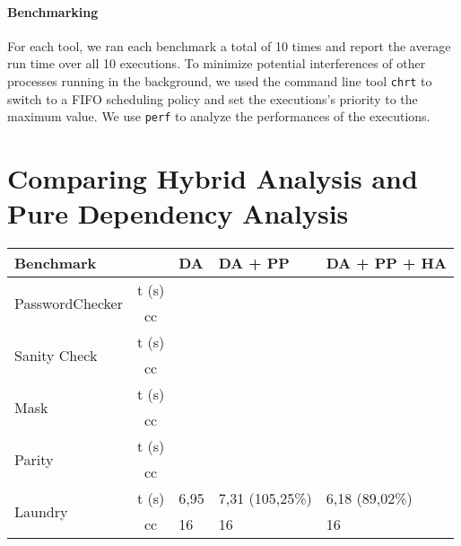 \paragraph{Benchmarking}
For each tool, we ran each benchmark a total of 10 times and report the average run time over all 10 executions. To minimize potential interferences of other processes running in the background, we used the command line tool \texttt{chrt} to switch to a FIFO scheduling policy and set the executions's priority to the maximum value.
We use \texttt{perf} to analyze the performances of the executions.

\section{Comparing Hybrid Analysis and Pure Dependency Analysis}
\begin{center}
\begin{table}[]
    \begin{tabular}{|l|c|l|l|l|}
    \hline
    \textbf{Benchmark}               & \multicolumn{1}{l|}{}      & DA & DA + PP & DA + PP + HA \\ \hline
    \multirow{2}{*}{PasswordChecker} & \multicolumn{1}{l|}{t (s)} &    &         &               \\ \cline{2-5} 
                                     & cc                         &    &         &               \\ \hline
    \multirow{2}{*}{Sanity Check}    & \multicolumn{1}{l|}{t (s)} &    &         &               \\ \cline{2-5} 
                                     & cc                         &    &         &               \\ \hline
    \multirow{2}{*}{Mask}            & t (s)                      &    &         &               \\ \cline{2-5} 
                                     & cc                         &    &         &               \\ \hline
    \multirow{2}{*}{Parity}          & t (s)                      &    &         &               \\ \cline{2-5} 
                                     & cc                         &    &         &               \\ \hline
    \multirow{2}{*}{Laundry}         & t (s)                      &  6,95  &  7,31 (105,25\%) & 6,18 (89,02\%) \\ \cline{2-5} 
                                     & cc                         & 16 &    16     &    16           \\ \hline

\end{tabular}
\end{table}
\end{center}
